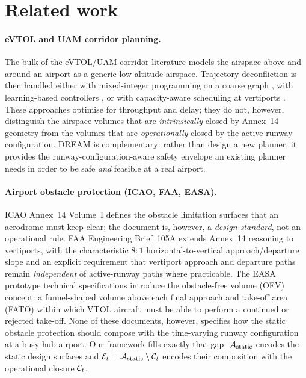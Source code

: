 \section{Related work}
\label{sec:related}

\paragraph{eVTOL and UAM corridor planning.}
The bulk of the eVTOL/UAM corridor literature models the airspace above and
around an airport as a generic low-altitude airspace. Trajectory deconfliction
is then handled either with mixed-integer programming on a coarse graph
\citep{bulusu2021,tang2021}, with learning-based controllers
\citep{kleinbekman2020}, or with capacity-aware scheduling at vertiports
\citep{vascik2019,pang2022}. These approaches optimise for throughput and
delay; they do not, however, distinguish the airspace volumes that are
\emph{intrinsically} closed by Annex~14 geometry from the volumes that are
\emph{operationally} closed by the active runway configuration. DREAM is
complementary: rather than design a new planner, it provides the
runway-configuration-aware safety envelope an existing planner needs in
order to be safe \emph{and} feasible at a real airport.

\paragraph{Airport obstacle protection (ICAO, FAA, EASA).}
ICAO Annex~14 Volume~I \citep{icao_annex14} defines the obstacle limitation
surfaces that an aerodrome must keep clear; the document is, however, a
\emph{design standard}, not an operational rule. FAA Engineering Brief~105A
\citep{faa_eb_105a} extends Annex~14 reasoning to vertiports, with the
characteristic $8:1$ horizontal-to-vertical approach/departure slope and an
explicit requirement that vertiport approach and departure paths remain
\emph{independent} of active-runway paths where practicable. The EASA
prototype technical specifications \citep{easa_vertiport_proto} introduce
the obstacle-free volume (OFV) concept: a funnel-shaped volume above each
final approach and take-off area (FATO) within which VTOL aircraft must be
able to perform a continued or rejected take-off. None of these documents,
however, specifies how the static obstacle protection should compose with
the time-varying runway configuration at a busy hub airport. Our framework
fills exactly that gap: $\mathcal{A}_{\mathrm{static}}$ encodes the static design surfaces
and $\mathcal{E}_t = \mathcal{A}_{\mathrm{static}} \setminus \mathcal{C}_t$ encodes their composition with the
operational closure $\mathcal{C}_t$.

